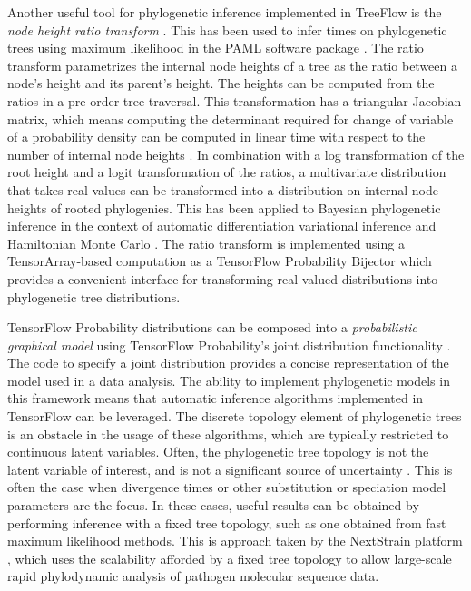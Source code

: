 Another useful tool for phylogenetic inference implemented in TreeFlow is the \textit{node height ratio transform} \cite{kishino2001performance}. This has been used to infer times on phylogenetic trees using maximum likelihood in the PAML software package \cite{yang2007paml}. The ratio transform parametrizes the internal node heights of a tree as the ratio between a node's height and its parent's height. The heights can be computed from the ratios in a pre-order tree traversal. This transformation has a triangular Jacobian matrix, which means computing the determinant required for change of variable of a probability density can be computed in linear time with respect to the number of internal node heights \cite{fourment2019evaluating}. In combination with a log transformation of the root height and a logit transformation of the ratios, a multivariate distribution that takes real values can be transformed into a distribution on internal node heights of rooted phylogenies. This has been applied to Bayesian phylogenetic inference in the context of automatic differentiation variational inference \cite{fourment2019evaluating} and Hamiltonian Monte Carlo \cite{ji2021scalable}. The ratio transform is implemented using a TensorArray-based computation as a TensorFlow Probability Bijector which provides a convenient interface for transforming real-valued distributions into phylogenetic tree distributions.

TensorFlow Probability distributions can be composed into a \textit{probabilistic graphical model} using TensorFlow Probability's joint distribution functionality \cite{piponi2020joint}. The code to specify a joint distribution provides a concise representation of the model used in a data analysis. The ability to implement phylogenetic models in this framework means that automatic inference algorithms implemented in TensorFlow can be leveraged. The discrete topology element of phylogenetic trees is an obstacle in the usage of these algorithms, which are typically restricted to continuous latent variables. Often, the phylogenetic tree topology is not the latent variable of interest, and is not a significant source of uncertainty \cite{yang2000codon}. This is often the case when divergence times or other substitution or speciation model parameters are the focus. In these cases, useful results can be obtained by performing inference with a fixed tree topology, such as one obtained from fast maximum likelihood methods. This is approach taken by the NextStrain platform \cite{hadfield2018nextstrain}, which uses the scalability afforded by a fixed tree topology to allow large-scale rapid phylodynamic analysis of pathogen molecular sequence data.

